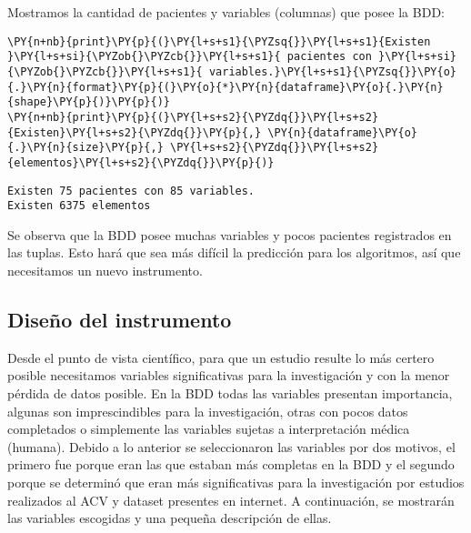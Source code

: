     Mostramos la cantidad de pacientes y variables (columnas) que posee la
BDD:

    \begin{tcolorbox}[breakable, size=fbox, boxrule=1pt, pad at break*=1mm,colback=cellbackground, colframe=cellborder]
\begin{Verbatim}[commandchars=\\\{\}]
\PY{n+nb}{print}\PY{p}{(}\PY{l+s+s1}{\PYZsq{}}\PY{l+s+s1}{Existen }\PY{l+s+si}{\PYZob{}\PYZcb{}}\PY{l+s+s1}{ pacientes con }\PY{l+s+si}{\PYZob{}\PYZcb{}}\PY{l+s+s1}{ variables.}\PY{l+s+s1}{\PYZsq{}}\PY{o}{.}\PY{n}{format}\PY{p}{(}\PY{o}{*}\PY{n}{dataframe}\PY{o}{.}\PY{n}{shape}\PY{p}{)}\PY{p}{)}
\PY{n+nb}{print}\PY{p}{(}\PY{l+s+s2}{\PYZdq{}}\PY{l+s+s2}{Existen}\PY{l+s+s2}{\PYZdq{}}\PY{p}{,} \PY{n}{dataframe}\PY{o}{.}\PY{n}{size}\PY{p}{,} \PY{l+s+s2}{\PYZdq{}}\PY{l+s+s2}{elementos}\PY{l+s+s2}{\PYZdq{}}\PY{p}{)}
\end{Verbatim}
\end{tcolorbox}

    \begin{Verbatim}[commandchars=\\\{\}]
Existen 75 pacientes con 85 variables.
Existen 6375 elementos
    \end{Verbatim}

    Se observa que la BDD posee muchas variables y pocos pacientes registrados en las tuplas. Esto hará que sea más difícil la predicción para los algoritmos, así que necesitamos un nuevo instrumento.

    \hypertarget{diseuxf1o-del-instrumento}{%
\subsection{Diseño del instrumento}\label{diseuxf1o-del-instrumento}}

Desde el punto de vista científico, para que un estudio resulte lo más certero posible necesitamos variables significativas para la investigación y con la menor pérdida de datos posible. En la BDD todas las variables presentan importancia, algunas son imprescindibles para la investigación, otras con pocos datos completados o simplemente las variables sujetas a interpretación médica (humana). Debido a lo anterior se seleccionaron las variables por dos motivos, el primero fue porque eran las que estaban más completas en la BDD y el segundo porque se determinó que eran más significativas para la investigación por estudios realizados al ACV y dataset presentes en internet. A continuación, se mostrarán las variables escogidas y una pequeña descripción de ellas.

